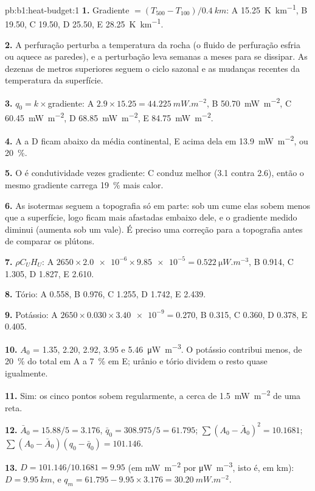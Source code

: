 \begin{solution}{pb:b1:heat-budget:1}
\textbf{1.} Gradiente $= (T_{500} - T_{100})/\qty{0.4}{km}$: A \qty{15.25}{K.km^{-1}},
B \num{19.50}, C \num{19.50}, D \num{25.50}, E \qty{28.25}{K.km^{-1}}.

\textbf{2.} A perfuração perturba a temperatura da rocha (o fluido de perfuração
esfria ou aquece as paredes), e a perturbação leva semanas a meses para se dissipar.
As dezenas de metros superiores seguem o ciclo sazonal e as mudanças recentes da
temperatura da superfície.

\textbf{3.} $q_0 = k\times$gradiente: A $2.9\times15.25 = \qty{44.225}{mW.m^{-2}}$,
B \qty{50.70}{mW.m^{-2}}, C \qty{60.45}{mW.m^{-2}}, D \qty{68.85}{mW.m^{-2}},
E \qty{84.75}{mW.m^{-2}}.

\textbf{4.} A a D ficam abaixo da média continental, E acima dela em
\qty{13.9}{mW.m^{-2}}, ou \qty{20}{\percent}.

\textbf{5.} O  é condutividade vezes gradiente: C conduz melhor (3.1
contra 2.6), então o mesmo gradiente carrega \qty{19}{\percent} mais calor.

\textbf{6.} As isotermas seguem a topografia só em parte: sob um cume elas sobem menos que a
superfície, logo ficam mais afastadas embaixo dele, e o gradiente medido diminui
(aumenta sob um vale). É preciso uma correção para a topografia antes de comparar os plútons.

\textbf{7.} $\rho C_U H_U$: A $2650\times\num{2.0e-6}\times\num{9.85e-5} =
\qty{0.522}{\micro W.m^{-3}}$, B 0.914, C 1.305, D 1.827, E 2.610.

\textbf{8.} Tório: A 0.558, B 0.976, C 1.255, D 1.742, E 2.439.

\textbf{9.} Potássio: A $2650\times0.030\times\num{3.40e-9} = 0.270$, B 0.315,
C 0.360, D 0.378, E 0.405.

\textbf{10.} $A_0$ = 1.35, 2.20, 2.92, 3.95 e \qty{5.46}{\micro W.m^{-3}}.
O potássio contribui menos, de \qty{20}{\percent} do total em A a
\qty{7}{\percent} em E; urânio e tório dividem o resto quase igualmente.

\textbf{11.} Sim: os cinco pontos sobem regularmente, a cerca de
\qty{1.5}{mW.m^{-2}} de uma reta.

\textbf{12.} $\bar A_0 = 15.88/5 = 3.176$, $\bar q_0 = 308.975/5 = 61.795$;
$\sum(A_0 - \bar A_0)^2 = 10.1681$; $\sum(A_0 - \bar A_0)(q_0 - \bar q_0) =
101.146$.

\textbf{13.} $D = 101.146/10.1681 = 9.95$ (em \unit{mW.m^{-2}} por
\unit{\micro W.m^{-3}}, isto é, em km): $D = \qty{9.95}{km}$, e $q_m = 61.795 -
9.95\times3.176 = \qty{30.20}{mW.m^{-2}}$.


\end{solution}
